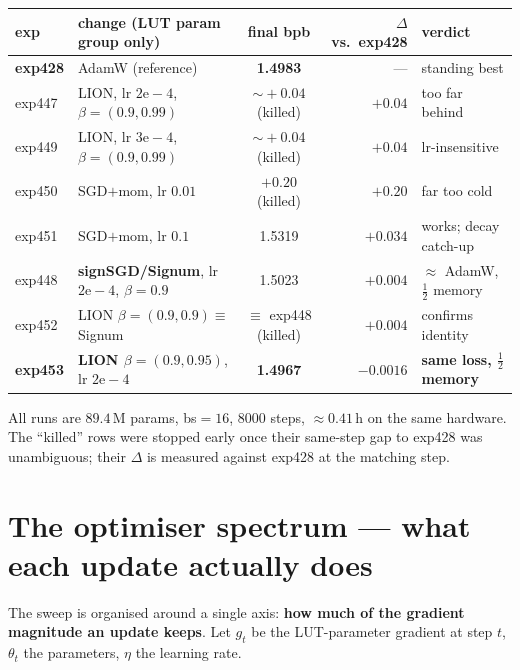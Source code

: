 \documentclass[11pt]{article}
\begin{document}
\begin{table}[h]
\centering
\small
\setlength{\tabcolsep}{2.3pt}
\renewcommand{\arraystretch}{1.15}
\begin{tabular}{@{}llcr l@{}}
\toprule
exp & change (LUT param group only) & final bpb & $\Delta$ vs.\ exp428 & verdict \\
\midrule
\textbf{exp428} & AdamW (reference) & \textbf{1.4983} & --- & standing best \\
exp447 & LION, lr $2\mathrm{e}{-}4$, $\beta=(0.9,\mathbf{0.99})$ & $\sim\!+0.04$ (killed) & $+0.04$ & too far behind \\
exp449 & LION, lr $3\mathrm{e}{-}4$, $\beta=(0.9,0.99)$ & $\sim\!+0.04$ (killed) & $+0.04$ & lr-insensitive \\
exp450 & SGD$+$mom, lr $\mathbf{0.01}$ & $+0.20$ (killed) & $+0.20$ & far too cold \\
exp451 & SGD$+$mom, lr $\mathbf{0.1}$ & 1.5319 & $+0.034$ & works; decay catch-up \\
exp448 & \textbf{signSGD/Signum}, lr $2\mathrm{e}{-}4$, $\beta=0.9$ & 1.5023 & $+0.004$ & $\approx$ AdamW, $\tfrac12$ memory \\
exp452 & LION $\beta=(0.9,\mathbf{0.9})\equiv$ Signum & $\equiv$ exp448 (killed) & $+0.004$ & confirms identity \\
\textbf{exp453} & \textbf{LION $\beta=(0.9,0.95)$}, lr $2\mathrm{e}{-}4$ & \textbf{1.4967} & $\mathbf{-0.0016}$ & \textbf{same loss, $\tfrac12$ memory} \\
\bottomrule
\end{tabular}
\end{table}

\noindent
All runs are $89.4$\,M params, bs$=16$, $8000$ steps, $\approx 0.41$\,h on the
same hardware. The ``killed'' rows were stopped early once their
same-step gap to exp428 was unambiguous; their $\Delta$ is measured
against exp428 at the matching step.

\section{The optimiser spectrum --- what each update actually does}
\label{sec:math}

The sweep is organised around a single axis: \textbf{how much of the
gradient magnitude an update keeps}. Let $g_t$ be the LUT-parameter
gradient at step $t$, $\theta_t$ the parameters, $\eta$ the learning rate.
\end{document}
